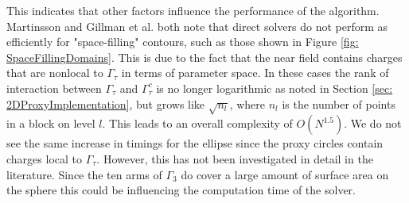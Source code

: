 \documentclass{sfuthesis}
\begin{document}
This indicates that other factors influence the performance of the algorithm. Martinsson \cite{CBMS} and Gillman et al. \cite{GillYoungMart2012} both note that direct solvers do not perform as efficiently for "space-filling" contours, such as those shown in Figure \ref{fig: SpaceFillingDomains}. This is due to the fact that the near field contains charges that are nonlocal to $\Gamma_\tau$ in terms of parameter space. In these cases the rank of interaction between $\Gamma_\tau$ and $\Gamma_\tau^c$ is no longer logarithmic as noted in Section \ref{sec: 2DProxyImplementation}, but grows like $\sqrt{n_l}$, where $n_l$ is the number of points in a block on level $l$. This leads to an overall complexity of $O(N^{1.5})$. We do not see the same increase in timings for the ellipse since the proxy circles contain charges local to $\Gamma_\tau$. However, this has not been investigated in detail in the literature. Since the ten arms of $\Gamma_3$ do cover a large amount of surface area on the sphere this could be influencing the computation time of the solver. 
\end{document}
